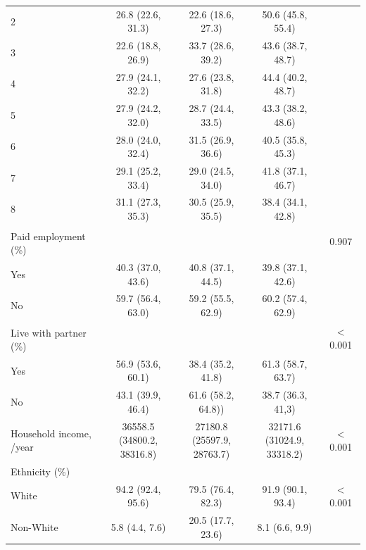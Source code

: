 \begin{table}[H]
\begin{tabular}[t]{lcccc}
	\hspace{1em}2 & 26.8 (22.6, 31.3) & 22.6 (18.6, 27.3) & 50.6 (45.8, 55.4) & \\
	\hspace{1em}3 & 22.6 (18.8, 26.9) & 33.7 (28.6, 39.2) & 43.6 (38.7, 48.7) & \\
	\hspace{1em}4 & 27.9 (24.1, 32.2) & 27.6 (23.8, 31.8) & 44.4 (40.2, 48.7) & \\
	\hspace{1em}5 & 27.9 (24.2, 32.0) & 28.7 (24.4, 33.5) & 43.3 (38.2, 48.6) & \\
	\hspace{1em}6 & 28.0 (24.0, 32.4) & 31.5 (26.9, 36.6) & 40.5 (35.8, 45.3) & \\
	\hspace{1em}7 & 29.1 (25.2, 33.4) & 29.0 (24.5, 34.0) & 41.8 (37.1, 46.7) & \\
	\hspace{1em}8 & 31.1 (27.3, 35.3) & 30.5 (25.9, 35.5) & 38.4 (34.1, 42.8) & \\
	Paid employment\textsuperscript{\dag} (\%) &  &  &  & 0.907\\
	\hspace{1em}Yes & 40.3 (37.0, 43.6) & 40.8 (37.1, 44.5) & 39.8 (37.1, 42.6) & \\
	\hspace{1em}No & 59.7 (56.4, 63.0) & 59.2 (55.5, 62.9) & 60.2 (57.4, 62.9) & \\
	Live with partner\textsuperscript{\ddag} (\%) &  &  &  & < 0.001\\
	\hspace{1em}Yes & 56.9 (53.6, 60.1) & 38.4 (35.2, 41.8) & 61.3 (58.7, 63.7) & \\
	\hspace{1em}No & 43.1 (39.9, 46.4) & 61.6 (58.2, 64.8)) & 38.7 (36.3, 41,3) & \\
	Household income, \textsterling/year & \Centerstack{36558.5\\(34800.2, 38316.8)} & \Centerstack{27180.8\\(25597.9, 28763.7)} & \Centerstack{32171.6\\(31024.9, 33318.2)} & < 0.001\\
	Ethnicity (\%) &  &  &  & \\
	\hspace{1em}White & 94.2 (92.4, 95.6) & 79.5 (76.4, 82.3) & 91.9 (90.1, 93.4) & < 0.001\\
	\hspace{1em}Non-White & 5.8 (4.4, 7.6) & 20.5 (17.7, 23.6) & 8.1 (6.6, 9.9) & \\

\end{tabular}
\end{table}
